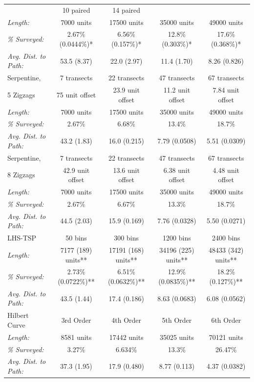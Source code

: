 \documentclass[review]{elsarticle}
\begin{document}
\begin{table}
\begin{tabular}{|l|c|c|c|c|}
&
10 paired
&
14 paired
\\
\hfill\emph{Length:}
&
7000 units
&
17500 units
&
35000 units
&
49000 units
\\
\hfill\emph{\% Surveyed:}
&
2.67\% (0.0444\%)*
&
6.56\% (0.157\%)*
&
12.8\% (0.303\%)*
&
17.6\% (0.368\%)*
\\
\hfill\emph{Avg. Dist. to Path:}
&
53.5 (8.37)
&
22.0 (2.97)
&
11.4 (1.70)
&
8.26 (0.826)
\\
\hline
Serpentine,
&
7 transects
&
22 transects
&
47 transects
&
67 transects
\\
5 Zigzags
&
75 unit offset
&
23.9 unit offset
&
11.2 unit offset
&
7.84 unit offset
\\
\hfill\emph{Length:}
&
7000 units
&
17500 units
&
35000 units
&
49000 units
\\
\hfill\emph{\% Surveyed:}
&
2.67\%
&
6.68\%
&
13.4\%
&
18.7\%
\\
\hfill\emph{Avg. Dist. to Path:}
&
43.2 (1.83)
&
16.0 (0.215)
&
7.79 (0.0508)
&
5.51 (0.0309)
\\
\hline
Serpentine,
&
7 transects
&
22 transects
&
47 transects
&
67 transects
\\
8 Zigzags
&
42.9 unit offset
&
13.6 unit offset
&
6.38 unit offset
&
4.48 unit offset
\\
\hfill\emph{Length:}
&
7000 units
&
17500 units
&
35000 units
&
49000 units
\\
\hfill\emph{\% Surveyed:}
&
2.67\%
&
6.67\%
&
13.3\%
&
18.7\%
\\
\hfill\emph{Avg. Dist. to Path:}
&
44.5 (2.03)
&
15.9 (0.169)
&
7.76 (0.0328)
&
5.50 (0.0271)
\\
\hline
LHS-TSP
&
50 bins
&
300 bins
&
1200 bins
&
2400 bins
\\
\hfill\emph{Length:}
&
7177 (189) units**
&
17191 (168) units**
&
34196 (225) units**
&
48433 (342) units**
\\
\hfill\emph{\% Surveyed:}
&
2.73\% (0.0722\%)**
&
6.51\% (0.0632\%)**
&
12.9\% (0.0835\%)**
&
18.2\% (0.127\%)**
\\
\hfill\emph{Avg. Dist. to Path:}
&
43.5 (1.44)
&
17.4 (0.186)
&
8.63 (0.0683)
&
6.08 (0.0562)
\\
\hline
Hilbert Curve
&
3rd Order
&
4th Order
&
5th Order
&
6th Order
\\
\hfill\emph{Length:}
&
8581 units
&
17442 units
&
35025 units
&
70121 units
\\
\hfill\emph{\% Surveyed:}
&
3.27\%
&
6.634\%
&
13.3\%
&
26.47\%
\\
\hfill\emph{Avg. Dist. to Path:}
&
37.3 (1.95)
&
17.9 (0.480)
&
8.77 (0.113)
&
4.37 (0.0382)
\\
\hline
\end{tabular}
\end{table}
\end{document}
